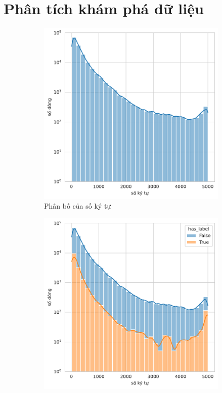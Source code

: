 \chapter*{Phân tích khám phá dữ liệu}
\begin{figure}[htb]
    \centering
    \begin{subfigure}[t]{0.5\textwidth}
        \centering
        \includegraphics[width=\textwidth]{chapter_2/image/dist_num_chars.pdf}
        \caption{Phân bố của số ký tự}
    \end{subfigure}%
    \begin{subfigure}[t]{0.5\textwidth}
        \centering
        \includegraphics[width=\textwidth]{chapter_2/image/dist_num_chars_by_has_label.pdf}

\end{subfigure}
\end{figure}
